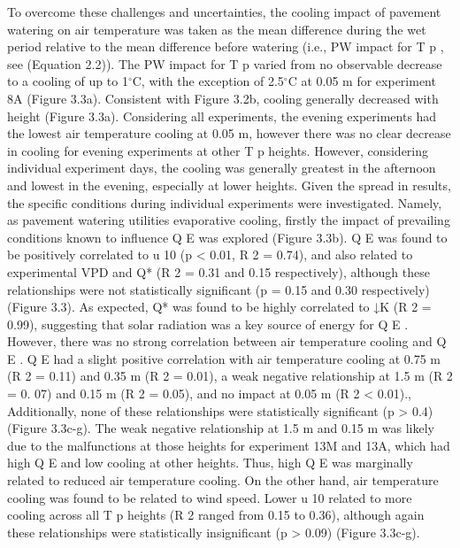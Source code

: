 \documentclass[final,3p,times,authoryear]{elsarticle}
\begin{document}
To overcome these challenges and uncertainties, the cooling impact of pavement
watering on air temperature was taken as the mean difference during the wet period
relative to the mean difference before watering (i.e., PW impact for T p , see (Equation 2.2)).
The PW impact for T p varied from no observable decrease to a cooling of up to 1$^{\circ}$C, with
the exception of 2.5$^{\circ}$C at 0.05 m for experiment 8A (Figure 3.3a). Consistent with
Figure 3.2b, cooling generally decreased with height (Figure 3.3a). Considering all
experiments, the evening experiments had the lowest air temperature cooling at 0.05 m,
however there was no clear decrease in cooling for evening experiments at other T p
heights. However, considering individual experiment days, the cooling was generally
greatest in the afternoon and lowest in the evening, especially at lower heights.
Given the spread in results, the specific conditions during individual experiments were
investigated. Namely, as pavement watering utilities evaporative cooling, firstly the
impact of prevailing conditions known to influence Q E was explored (Figure 3.3b). Q E was found to be positively correlated to u 10 (p < 0.01, R 2 = 0.74), and also related to
experimental VPD and Q* (R 2 = 0.31 and 0.15 respectively), although these
relationships were not statistically significant (p = 0.15 and 0.30 respectively) (Figure
3.3). As expected, Q* was found to be highly correlated to ↓K (R 2 = 0.99), suggesting
that solar radiation was a key source of energy for Q E .
However, there was no strong correlation between air temperature cooling and Q E . Q E
had a slight positive correlation with air temperature cooling at 0.75 m (R 2 = 0.11) and
0.35 m (R 2 = 0.01), a weak negative relationship at 1.5 m (R 2 = 0. 07) and 0.15 m (R 2 =
0.05), and no impact at 0.05 m (R 2 < 0.01)., Additionally, none of these relationships
were statistically significant (p > 0.4) (Figure 3.3c-g). The weak negative relationship at
1.5 m and 0.15 m was likely due to the malfunctions at those heights for experiment
13M and 13A, which had high Q E and low cooling at other heights. Thus, high Q E was
marginally related to reduced air temperature cooling.
On the other hand, air temperature cooling was found to be related to wind speed.
Lower u 10 related to more cooling across all T p heights (R 2 ranged from 0.15 to 0.36),
although again these relationships were statistically insignificant (p > 0.09) (Figure
3.3c-g).
\end{document}
